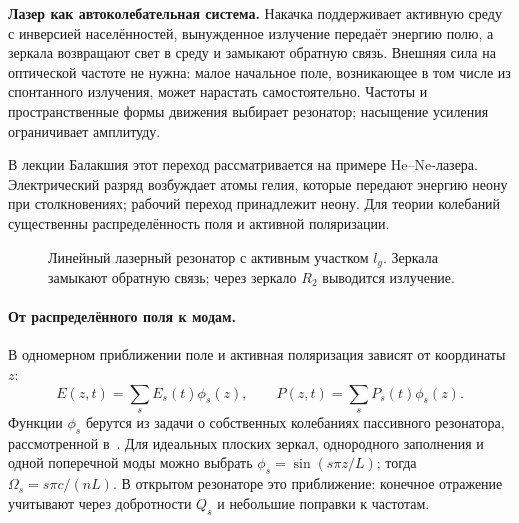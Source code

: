 \textbf{Лазер как автоколебательная система.} Накачка поддерживает активную среду с инверсией населённостей, вынужденное излучение передаёт энергию полю, а зеркала возвращают свет в среду и замыкают обратную связь. Внешняя сила на оптической частоте не нужна: малое начальное поле, возникающее в том числе из спонтанного излучения, может нарастать самостоятельно. Частоты и пространственные формы движения выбирает резонатор; насыщение усиления ограничивает амплитуду.

В лекции Балакшия этот переход рассматривается на примере He--Ne-лазера. Электрический разряд возбуждает атомы гелия, которые передают энергию неону при столкновениях; рабочий переход принадлежит неону. Для теории колебаний существенны распределённость поля и активной поляризации.

\begin{figure}[H]\centering
{}
\caption{Линейный лазерный резонатор с активным участком $l_g$. Зеркала замыкают обратную связь; через зеркало $R_2$ выводится излучение.}
\end{figure}

\paragraph{От распределённого поля к модам.}
В одномерном приближении поле и активная поляризация зависят от координаты $z$:
\begin{equation}
 E(z,t)=\sum_s E_s(t)\phi_s(z),\qquad
 P(z,t)=\sum_s P_s(t)\phi_s(z).
\end{equation}
Функции $\phi_s$ берутся из задачи о собственных колебаниях пассивного резонатора, рассмотренной в~. Для идеальных плоских зеркал, однородного заполнения и одной поперечной моды можно выбрать $\phi_s=\sin(s\pi z/L)$; тогда $\Omega_s=s\pi c/(nL)$. В открытом резонаторе это приближение: конечное отражение учитывают через добротности $Q_s$ и небольшие поправки к частотам.

